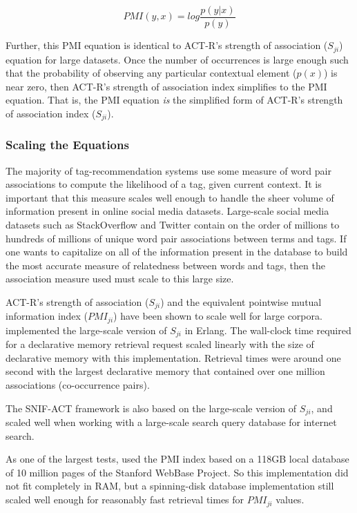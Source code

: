 \documentclass[man,floatsintext,donotrepeattitle]{apa6}
\begin{document}
\begin{equation}
  \label{eqPMI}
  \mathit{PMI}(y,x) = log \frac{p(y|x)}{p(y)}
\end{equation}

Further, this PMI equation is identical to ACT-R's strength of association ($S_{ji}$) equation for large datasets.
Once the number of occurrences is large enough such that the probability of observing any particular contextual element ($p(x)$) is near zero, then ACT-R's strength of association index simplifies to the PMI equation.
That is, the PMI equation \emph{is} the simplified form of ACT-R's strength of association index ($S_{ji}$).

\subsubsection{Scaling the Equations}

The majority of tag-recommendation systems use some measure of word pair associations to compute the likelihood of a tag, given current context.
It is important that this measure scales well enough to handle the sheer volume of information present in online social media datasets.
Large-scale social media datasets such as StackOverflow and Twitter contain on the order of millions to hundreds of millions of unique word pair associations between terms and tags.
If one wants to capitalize on all of the information present in the database to build the most accurate measure of relatedness between words and tags, then the association measure used must scale to this large size.

ACT-R's strength of association ($S_{ji}$) and the equivalent pointwise mutual information index ($\mathit{PMI}_{ji}$) have been shown to scale well for large corpora.
\textcite{Douglass2010} implemented the large-scale version of $S_{ji}$ in Erlang.
The wall-clock time required for a declarative memory retrieval request scaled linearly with the size of declarative memory with this implementation.
Retrieval times were around one second with the largest declarative memory that contained over one million associations (co-occurrence pairs).

The SNIF-ACT framework \parencites{Fu2007,Pirolli2003} is also based on the large-scale version of $S_{ji}$, and scaled well when working with a large-scale search query database for internet search.

As one of the largest tests, \textcite{Farahat2004} used the PMI index based on a 118GB local database of 10 million pages of the Stanford WebBase Project.
So this implementation did not fit completely in RAM, but a spinning-disk database implementation still scaled well enough for reasonably fast retrieval times for $\mathit{PMI}_{ji}$ values.
\end{document}
